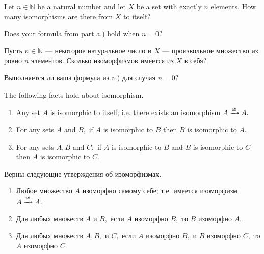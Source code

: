 \documentclass[../main/CT4S-EN-RU]{subfiles}
\begin{document}
\begin{exerciseENG}
Let $n\in{ℕ}$ be a natural number and let $X$ be a set with exactly $n$ elements. 
\sexc How many isomorphisms are there from $X$ to itself? 
\item Does your formula from part a.) hold when $n=0?$
\endsexc
\end{exerciseENG}

\begin{exerciseRUS}
Пусть $n\in{ℕ}$ — некоторое натуральное число и $X$ — произвольное множество из ровно $n$ элементов. 
\sexc Сколько изоморфизмов имеется из $X$ в себя? 
\item Выполняется ли ваша формула из a.) для случая $n=0?$
\endsexc 
\end{exerciseRUS}

\begin{lemmaENG}\label{lemma:isomorphic ER in Set}
The following facts hold about isomorphism.
\begin{enumerate}
\item Any set $A$ is isomorphic to itself; i.e. there exists an isomorphism $A\xrightarrow{\cong} A.$
\item For any sets $A$ and $B,$ if $A$ is isomorphic to $B$ then $B$ is isomorphic to $A.$
\item For any sets $A, B$ and $C,$ if $A$ is isomorphic to $B$ and $B$ is isomorphic to $C$ then $A$ is isomorphic to $C.$
\end{enumerate}
\end{lemmaENG}

\begin{lemmaRUS}\label{lemma:isomorphic ER in Set}
Верны следующие утверждения об изоморфизмах.
\begin{enumerate}
\item Любое множество $A$ изоморфно самому себе; т.е. имеется изоморфизм $A\xrightarrow{\cong} A.$
\item Для любых множеств $A$ и $B,$ если $A$ изоморфно $B,$ то $B$ изоморфно $A.$
\item Для любых множеств $A, B,$ и $C,$ если $A$ изоморфно $B,$ и $B$ изоморфно $C,$ то $A$ изоморфно $C.$
\end{enumerate}
\end{lemmaRUS}
\end{document}
